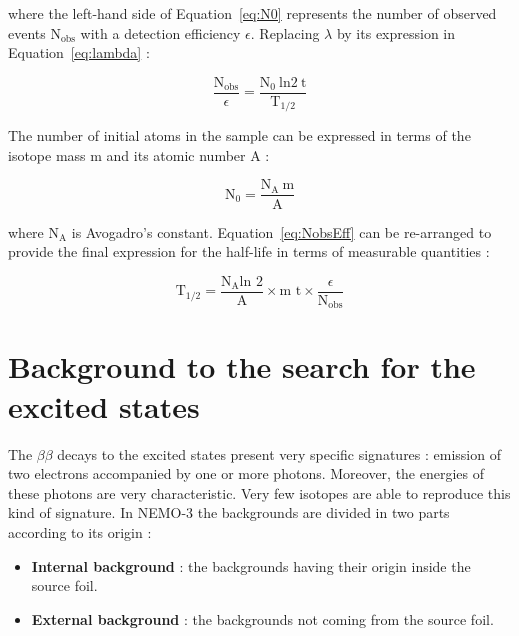\documentclass[main.tex]{subfiles}
\begin{document}
\bigskip


\NI where the left-hand side of Equation~\ref{eq:N0} represents the number of observed events N$_{\text{obs}}$ with a detection efficiency $\epsilon$. Replacing $\lambda$ by its expression in Equation~\ref{eq:lambda} : 

\begin{equation}\label{eq:NobsEff}
\frac{\text{N}_{\text{obs}}}{\epsilon} = \frac{\text{N}_\text{0}~\text{ln2}~\text{t}}{\text{T}_{\text{1/2}}}
\end{equation}


\bigskip


\NI The number of initial atoms in the sample can be expressed in terms of the isotope mass m and its atomic number A : 


\begin{equation}
\text{N}_\text{0} = \frac{\text{N}_\text{A}~\text{m}}{\text{A}}
\end{equation}


\bigskip


\NI where $\text{N}_\text{A}$ is Avogadro's constant. Equation~\ref{eq:NobsEff} can be re-arranged to provide the final expression for the half-life in terms of measurable quantities : 

\begin{equation}
\text{T}_{\text{1/2}} = \frac{\text{N}_\text{A} \text{ln 2}}{\text{A}} \times \text{m t} \times \frac{\epsilon}{\text{N}_{\text{obs}}}
\end{equation}



\section{Background to the search for the excited states}\label{sec:BKGexcitedStates}


\NI The $\beta \beta$ decays to the excited states present very specific signatures : emission of two electrons accompanied by one or more photons. Moreover, the energies of these photons are very characteristic. Very few isotopes are able to reproduce this kind of signature. In NEMO-3 the backgrounds are divided in two parts according to its origin : 


\begin{itemize}
\item \textbf{Internal background} : the backgrounds having their origin inside the source foil.
\item \textbf{External background} : the backgrounds not coming from the source foil.
\end{itemize}
\end{document}
